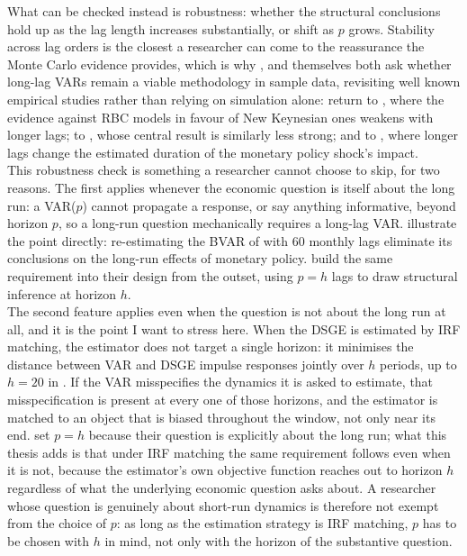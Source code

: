 \documentclass[12pt, a4paper]{article}
\begin{document}
What can be checked instead is robustness: whether
the structural conclusions hold up as the lag length increases substantially, or shift as $p$
grows. Stability across lag orders is the closest a researcher can come to the reassurance the
Monte Carlo evidence provides, which is why \citet{Baumeister2025}, and \citet{Long_Lag2025} themselves both
ask whether long-lag VARs remain a viable methodology in sample data, revisiting well known
empirical studies rather than relying on simulation alone: \citet{Long_Lag2025} return to
\citet{Gali1999}, where the evidence against RBC models in favour of New Keynesian ones
weakens with longer lags; to \citet{Chang_Hong2006}, whose central result is similarly less
strong; and to \citet{MirandaAgrippinoRicco2021}, where longer lags change the estimated
duration of the monetary policy shock's impact.
\\

This robustness check is something a researcher cannot choose to skip, for two reasons. The first
applies whenever the economic question is itself about the long run: a VAR($p$) cannot
propagate a response, or say anything informative, beyond horizon $p$, so a long-run question
mechanically requires a long-lag VAR. \citet{Baumeister2025} illustrate the point directly:
re-estimating the BVAR of \citet{Jorda2024long_run_mp} with 60 monthly lags eliminate its
conclusions on the long-run effects of monetary policy. \citet{Antolin-Diaz_Surico2025} build
the same requirement into their design from the outset, using $p=h$ lags to draw structural
inference at horizon $h$.
\\

The second feature applies even when the question is not about the long run at all, and it is
the point I want to stress here. When the DSGE is estimated by IRF matching, the estimator
does not target a single horizon: it minimises the distance between VAR and DSGE impulse
responses jointly over $h$ periods, up to $h=20$ in \citet{ACEL2011}. If the VAR misspecifies
the dynamics it is asked to estimate, that misspecification is present at every one of those
horizons, and the estimator is matched to an object that is biased throughout the window, not
only near its end. \citet{Antolin-Diaz_Surico2025} set $p=h$ because their question is
explicitly about the long run; what this thesis adds is that under IRF matching the same
requirement follows even when it is not, because the estimator's own objective function
reaches out to horizon $h$ regardless of what the underlying economic question asks about. A
researcher whose question is genuinely about short-run dynamics is therefore not exempt from
the choice of $p$: as long as the estimation strategy is IRF matching, $p$ has to be chosen
with $h$ in mind, not only with the horizon of the substantive question.
\\
\end{document}
